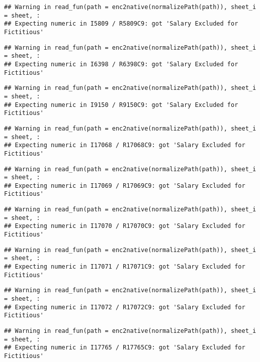 \documentclass[
]{article}
\begin{document}
\begin{verbatim}
## Warning in read_fun(path = enc2native(normalizePath(path)), sheet_i = sheet, :
## Expecting numeric in I5809 / R5809C9: got 'Salary Excluded for Fictitious'
\end{verbatim}

\begin{verbatim}
## Warning in read_fun(path = enc2native(normalizePath(path)), sheet_i = sheet, :
## Expecting numeric in I6398 / R6398C9: got 'Salary Excluded for Fictitious'
\end{verbatim}

\begin{verbatim}
## Warning in read_fun(path = enc2native(normalizePath(path)), sheet_i = sheet, :
## Expecting numeric in I9150 / R9150C9: got 'Salary Excluded for Fictitious'
\end{verbatim}

\begin{verbatim}
## Warning in read_fun(path = enc2native(normalizePath(path)), sheet_i = sheet, :
## Expecting numeric in I17068 / R17068C9: got 'Salary Excluded for Fictitious'
\end{verbatim}

\begin{verbatim}
## Warning in read_fun(path = enc2native(normalizePath(path)), sheet_i = sheet, :
## Expecting numeric in I17069 / R17069C9: got 'Salary Excluded for Fictitious'
\end{verbatim}

\begin{verbatim}
## Warning in read_fun(path = enc2native(normalizePath(path)), sheet_i = sheet, :
## Expecting numeric in I17070 / R17070C9: got 'Salary Excluded for Fictitious'
\end{verbatim}

\begin{verbatim}
## Warning in read_fun(path = enc2native(normalizePath(path)), sheet_i = sheet, :
## Expecting numeric in I17071 / R17071C9: got 'Salary Excluded for Fictitious'
\end{verbatim}

\begin{verbatim}
## Warning in read_fun(path = enc2native(normalizePath(path)), sheet_i = sheet, :
## Expecting numeric in I17072 / R17072C9: got 'Salary Excluded for Fictitious'
\end{verbatim}

\begin{verbatim}
## Warning in read_fun(path = enc2native(normalizePath(path)), sheet_i = sheet, :
## Expecting numeric in I17765 / R17765C9: got 'Salary Excluded for Fictitious'
\end{verbatim}
\end{document}
